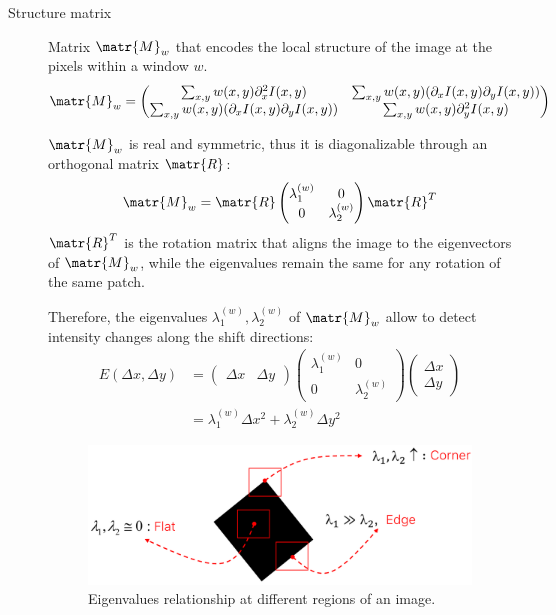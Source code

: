 \begin{description}
    \item[Structure matrix] 
        Matrix $\matr{M}_w$ that encodes the local structure of the image at the pixels within a window $w$.
        \[ \matr{M}_w = \begin{pmatrix} 
            \sum_{x, y} w(x, y) \partial_x^2 I(x, y)                        & \sum_{x, y} w(x, y) (\partial_x I(x, y) \partial_y I(x, y)) \\
            \sum_{x, y} w(x, y) (\partial_x I(x, y) \partial_y I(x, y))     & \sum_{x, y} w(x, y) \partial_y^2 I(x, y)
        \end{pmatrix} \]

        $\matr{M}_w$ is real and symmetric, thus it is diagonalizable through an orthogonal matrix $\matr{R}$:
        \[ \matr{M}_w = \matr{R} \begin{pmatrix} \lambda_1^{(w)} & 0 \\ 0 & \lambda_2^{(w)} \end{pmatrix} \matr{R}^T \]
        $\matr{R}^T$ is the rotation matrix that aligns the image to the eigenvectors of $\matr{M}_w$, 
        while the eigenvalues remain the same for any rotation of the same patch.

        Therefore, the eigenvalues $\lambda_1^{(w)}, \lambda_2^{(w)}$ of $\matr{M}_w$ allow to detect intensity changes along the shift directions:
        \[
            \begin{split}
                E(\Delta x, \Delta y) &= \begin{pmatrix} \Delta x & \Delta y \end{pmatrix} 
                    \begin{pmatrix} \lambda_1^{(w)} & 0 \\ 0 & \lambda_2^{(w)} \end{pmatrix}
                    \begin{pmatrix} \Delta x \\ \Delta y \end{pmatrix} \\
                &= \lambda_1^{(w)} \Delta x^2 + \lambda_2^{(w)} \Delta y^2
            \end{split}
        \]

        \begin{figure}[H]
            \centering
            \includegraphics[width=0.6\linewidth]{./img/_harris_rotation.pdf}
            \caption{Eigenvalues relationship at different regions of an image.}
        \end{figure}
\end{description}


